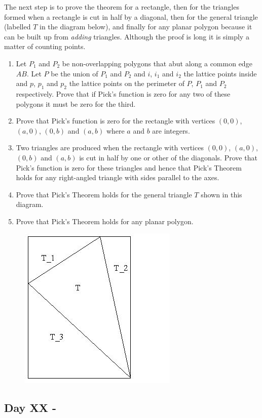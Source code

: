 \documentclass[]{scrartcl}
\begin{document}
The next step is to prove the theorem for a rectangle, then for the triangles formed when a rectangle is cut in half by a diagonal, then for the general triangle (labelled $T$ in the diagram below), and finally for any planar polygon because it can be built up from \emph{adding} triangles. Although the proof is long it is simply a matter of counting points.

\begin{enumerate}
\item Let $P_1$ and $P_2$ be non-overlapping polygons that abut along a common edge $AB$. Let $P$ be the union of $P_1$ and $P_2$ and $i$, $i_1$ and $i_2$ the lattice points inside and $p$, $p_1$ and $p_2$ the lattice points on the perimeter of $P$, $P_1$ and $P_2$ respectively. Prove that if Pick's function is zero for any two of these polygons it must be zero for the third.
\item Prove that Pick's function is zero for the rectangle with vertices $(0,0)$, $(a,0)$, $(0,b)$ and $(a,b)$ where $a$ and $b$ are integers.
\item Two triangles are produced when the rectangle with vertices $(0,0)$, $(a,0)$, $(0,b)$ and $(a,b)$ is cut in half by one or other of the diagonals. Prove that Pick's function is zero for these triangles and hence that Pick's Theorem holds for any right-angled triangle with sides parallel to the axes.
\item Prove that Pick's Theorem holds for the general triangle $T$ shown in this diagram. 
\item Prove that Pick's Theorem holds for any planar polygon.
\end{enumerate}

\begin{figure}[htbp]
\centering
\includegraphics[width=0.45\linewidth]{pick_theorem}
\end{figure}

\subsection{Day XX - }
\end{document}
